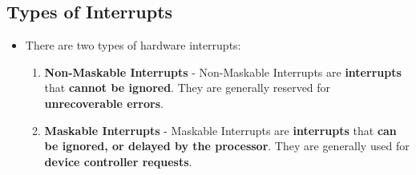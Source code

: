 \documentclass[16pt]{article}
\begin{document}
    \subsection*{Types of Interrupts}
    \begin{itemize}
        \item There are two types of hardware interrupts:
        \begin{enumerate}
            \item \textbf{Non-Maskable Interrupts} - Non-Maskable Interrupts are \textbf{interrupts} that \textbf{cannot be ignored}. They are generally reserved for \textbf{unrecoverable errors}.
            \item \textbf{Maskable Interrupts} - Maskable Interrupts are \textbf{interrupts} that \textbf{can be ignored, or delayed by the processor}. They are generally used for \textbf{device controller requests}.
        \end{enumerate}
    \end{itemize}

    \section*{}
\end{document}
